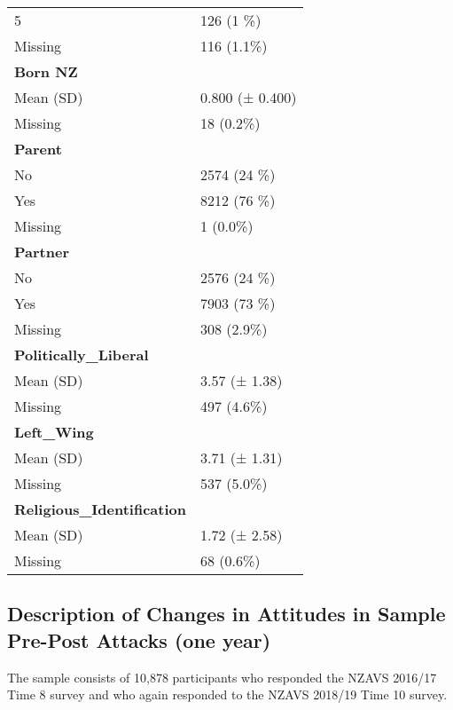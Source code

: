 \documentclass[
  singlecolumn]{report}
\begin{document}
\begin{longtable}[]{@{}ll@{}}
5 & 126 (1 \%) \\
Missing & 116 (1.1\%) \\
\textbf{Born NZ} & \\
Mean (SD) & 0.800 (± 0.400) \\
Missing & 18 (0.2\%) \\
\textbf{Parent} & \\
No & 2574 (24 \%) \\
Yes & 8212 (76 \%) \\
Missing & 1 (0.0\%) \\
\textbf{Partner} & \\
No & 2576 (24 \%) \\
Yes & 7903 (73 \%) \\
Missing & 308 (2.9\%) \\
\textbf{Politically\_Liberal} & \\
Mean (SD) & 3.57 (± 1.38) \\
Missing & 497 (4.6\%) \\
\textbf{Left\_Wing} & \\
Mean (SD) & 3.71 (± 1.31) \\
Missing & 537 (5.0\%) \\
\textbf{Religious\_Identification} & \\
Mean (SD) & 1.72 (± 2.58) \\
Missing & 68 (0.6\%) \\
\end{longtable}

\hypertarget{description-of-changes-in-attitudes-in-sample-pre-post-attacks-one-year}{%
\subsection{Description of Changes in Attitudes in Sample Pre-Post
Attacks (one
year)}\label{description-of-changes-in-attitudes-in-sample-pre-post-attacks-one-year}}

The sample consists of 10,878 participants who responded the NZAVS
2016/17 Time 8 survey and who again responded to the NZAVS 2018/19 Time
10 survey.
\end{document}
